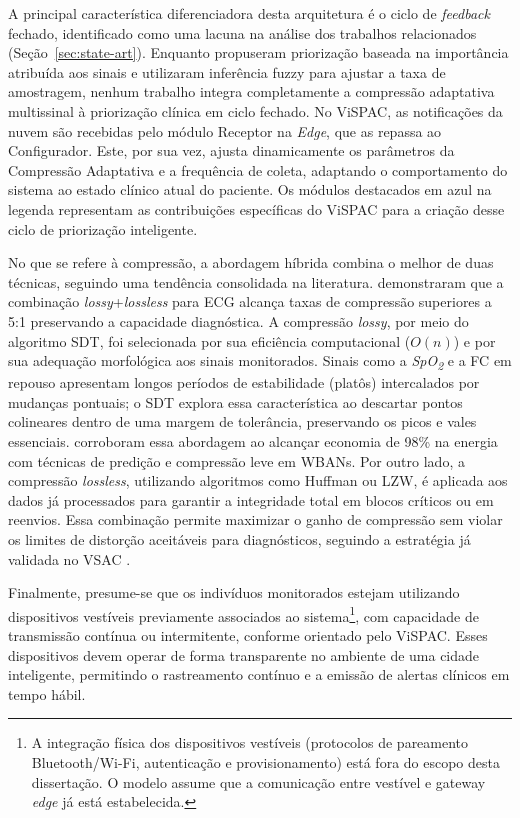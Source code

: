 \documentclass[twoside,english,brazilian]{UNISINOSmonografia}
\begin{document}
A principal característica diferenciadora desta arquitetura é o ciclo de \textit{feedback} fechado, identificado como uma lacuna na análise dos trabalhos relacionados (Seção~\ref{sec:state-art}). Enquanto \cite{TAO2025} propuseram priorização baseada na importância atribuída aos sinais e \cite{Shankani2025} utilizaram inferência fuzzy para ajustar a taxa de amostragem, nenhum trabalho integra completamente a compressão adaptativa multissinal à priorização clínica em ciclo fechado. No ViSPAC, as notificações da nuvem são recebidas pelo módulo Receptor na \textit{Edge}, que as repassa ao Configurador. Este, por sua vez, ajusta dinamicamente os parâmetros da Compressão Adaptativa e a frequência de coleta, adaptando o comportamento do sistema ao estado clínico atual do paciente. Os módulos destacados em azul na legenda representam as contribuições específicas do ViSPAC para a criação desse ciclo de priorização inteligente.

No que se refere à compressão, a abordagem híbrida combina o melhor de duas técnicas, seguindo uma tendência consolidada na literatura. \cite{Chang2024} demonstraram que a combinação \textit{lossy}+\textit{lossless} para ECG alcança taxas de compressão superiores a 5:1 preservando a capacidade diagnóstica. A compressão \textit{lossy}, por meio do algoritmo SDT, foi selecionada por sua eficiência computacional ($O(n)$) e por sua adequação morfológica aos sinais monitorados. Sinais como a \textit{SpO\textsubscript{2}} e a FC em repouso apresentam longos períodos de estabilidade (platôs) intercalados por mudanças pontuais; o SDT explora essa característica ao descartar pontos colineares dentro de uma margem de tolerância, preservando os picos e vales essenciais. \cite{Vakil2024} corroboram essa abordagem ao alcançar economia de 98\% na energia com técnicas de predição e compressão leve em WBANs. Por outro lado, a compressão \textit{lossless}, utilizando algoritmos como Huffman ou LZW, é aplicada aos dados já processados para garantir a integridade total em blocos críticos ou em reenvios. Essa combinação permite maximizar o ganho de compressão sem violar os limites de distorção aceitáveis para diagnósticos, seguindo a estratégia já validada no VSAC \cite{Andrade2025}.

Finalmente, presume-se que os indivíduos monitorados estejam utilizando dispositivos vestíveis previamente associados ao sistema\footnote{A integração física dos dispositivos vestíveis (protocolos de pareamento Bluetooth/Wi-Fi, autenticação e provisionamento) está fora do escopo desta dissertação. O modelo assume que a comunicação entre vestível e gateway \textit{edge} já está estabelecida.}, com capacidade de transmissão contínua ou intermitente, conforme orientado pelo ViSPAC. Esses dispositivos devem operar de forma transparente no ambiente de uma cidade inteligente, permitindo o rastreamento contínuo e a emissão de alertas clínicos em tempo hábil.
\end{document}
